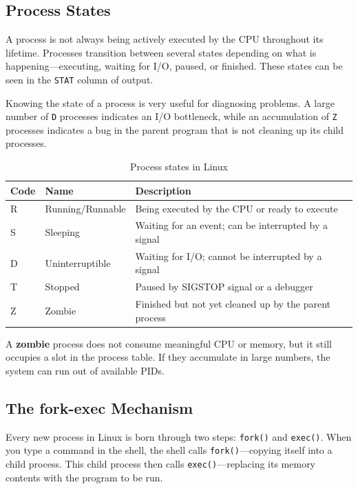 \subsection{Process States}

A process is not always being actively executed by the CPU throughout its
lifetime. Processes transition between several states depending on what is
happening---executing, waiting for I/O, paused, or finished. These states
can be seen in the \texttt{STAT} column of  output.

Knowing the state of a process is very useful for diagnosing problems. A large
number of \texttt{D} processes indicates an I/O bottleneck, while an
accumulation of \texttt{Z} processes indicates a bug in the parent program
that is not cleaning up its child processes.

\begin{table}[htbp]
  \centering
  \caption{Process states in Linux}
  \begin{tabular}{lll}
    \hline
    \textbf{Code} & \textbf{Name} & \textbf{Description} \\
    \hline
    R & Running/Runnable & Being executed by the CPU or ready to execute \\
    S & Sleeping         & Waiting for an event; can be interrupted by a signal \\
    D & Uninterruptible  & Waiting for I/O; cannot be interrupted by a signal \\
    T & Stopped          & Paused by SIGSTOP signal or a debugger \\
    Z & Zombie           & Finished but not yet cleaned up by the parent process \\
    \hline
  \end{tabular}
\end{table}

\begin{notebox}
  A \textbf{zombie} process does not consume meaningful CPU or memory, but it
  still occupies a slot in the process table. If they accumulate in large
  numbers, the system can run out of available PIDs.
\end{notebox}

\subsection{The fork-exec Mechanism}

Every new process in Linux is born through two steps: \texttt{fork()} and
\texttt{exec()}. When you type a command in the shell, the shell calls
\texttt{fork()}---copying itself into a child process. This child process then
calls \texttt{exec()}---replacing its memory contents with the program to be
run.

